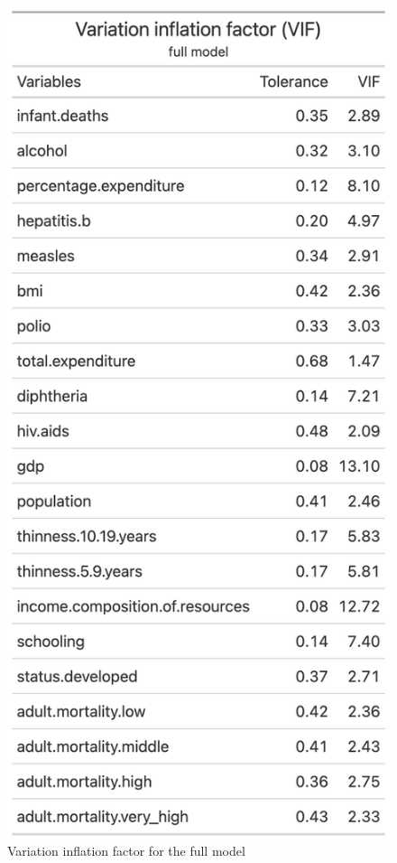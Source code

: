 \begin{figure}[H]
	\centering
	\includegraphics{figures/vif_full_model.png}
	\caption{Variation inflation factor for the full model}
	\label{fig:vif_full_model}
\end{figure}